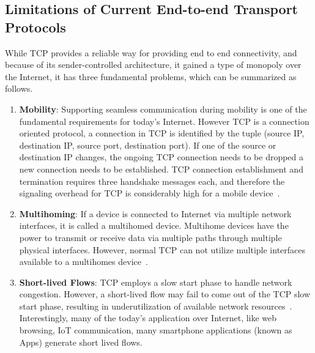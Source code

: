 \subsection{Limitations of Current End-to-end Transport Protocols}
While TCP provides a reliable way for providing end to end connectivity, and because of its sender-controlled architecture, it gained a type of monopoly over the Internet, it has three fundamental problems, which can be summarized as follows.  
\begin{enumerate}
	\item  \textbf{Mobility}: Supporting seamless communication during mobility is one of the fundamental requirements for today's Internet. However TCP is a connection oriented protocol, a connection in TCP is identified by the tuple (source IP, destination IP, source port, destination port). If one of the source or destination IP changes, the ongoing TCP connection needs to be dropped a new connection needs to be established. TCP connection establishment and termination requires three handshake messages each, and therefore the signaling overhead for TCP is considerably high for a mobile device~\cite{Yadav2016}. 
	\item \textbf{Multihoming}: If a device is connected to Internet via multiple network interfaces, it is called a multihomed device. Multihome devices have the power to transmit or receive data via multiple paths through multiple physical interfaces. However, normal TCP can not utilize multiple interfaces available to a multihomes device~\cite{abdrabou2016experimental,de2016observing}. 
	\item \textbf{Short-lived Flows}: TCP employs a slow start phase to handle network congestion. However, a short-lived flow may fail to come out of the TCP slow start phase, resulting in underutilization of available network resources~\cite{de2016throughput,islam2016start}. Interestingly, many of the today's application over Internet, like web browsing, IoT communication, many smartphone applications (known as Apps) generate short lived flows. 
\end{enumerate}

